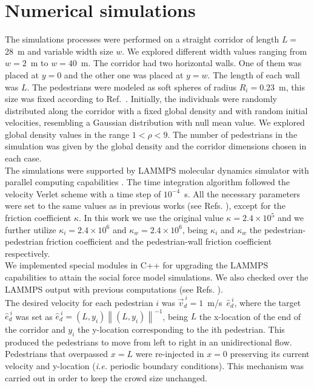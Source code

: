 \section{\label{simulations}Numerical simulations}

The simulations processes were performed on a straight corridor of length $L=$ 28~m and variable width size $w$. We explored different width values ranging from $w=2$~m to $w=40$~m. The corridor had two horizontal walls. One of them was placed at $y=0$ and the other one was placed at $y=w$. The length of each wall was $L$. The pedestrians were modeled as soft spheres of radius $R_i=0.23$~m, this size was fixed according to Ref.~\cite{metric_handbook}. Initially, the individuals were randomly distributed along the corridor with a fixed global density and with random initial velocities, resembling a Gaussian distribution with null mean value. We explored global density values in the range $1<\rho<9$. The number of pedestrians in the simulation was given by the global density and the corridor dimensions chosen in each case. \\

The simulations were supported by LAMMPS molecular dynamics simulator with parallel computing capabilities \cite{plimpton}.
The time integration algorithm followed the velocity Verlet scheme with a time step of $10^{-4}$~s. All the necessary parameters
were set to the same values as in previous works (see Refs. \cite{sticco,Dorso5}), except for the friction coefficient $\kappa$. In this work we use the original value $\kappa=2.4 \times 10^{5}$ and we further utilize $\kappa_i=2.4 \times 10^{6}$ and $\kappa_w=2.4 \times 10^{6}$, being $\kappa_i$ and $\kappa_w$ the pedestrian-pedestrian friction coefficient and the pedestrian-wall friction coefficient respectively. \\

We implemented special modules in C++ for upgrading the LAMMPS capabilities to attain the social force model simulations. We also checked over the LAMMPS output with previous computations (see Refs. \cite{Dorso1, Dorso2,Dorso3, Dorso4,Dorso6}).\\

The desired velocity for each pedestrian $i$ was $\vec{v}_d^{~i}=1$~m/s~$\hat{e}_d^{~i}$, where the target $\hat{e}_d^{~i}$ was set as $\hat{e}_d^{~i}=(L,y_i)\left \| (L,y_i) \right \|^{-1}$, being $L$ the x-location of the end of the corridor and $y_i$ the y-location corresponding to the ith pedestrian. This produced the pedestrians to move from left to right in an unidirectional flow. Pedestrians that overpassed $x=L$ were re-injected in $x=0$ preserving its current velocity and y-location (\textit{i.e.} periodic boundary conditions). This mechanism was carried out in order to keep
the crowd size unchanged.\\

